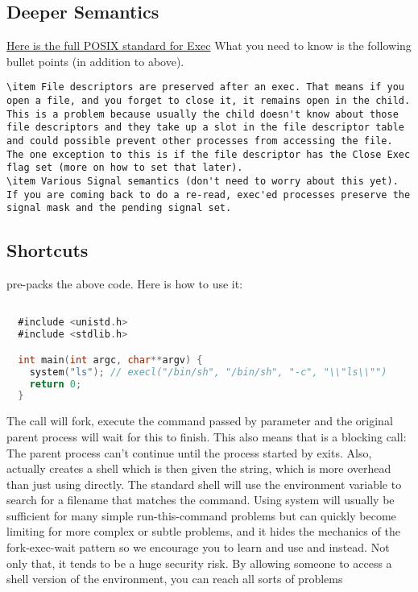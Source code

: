 \subsection{Deeper Semantics}

\href{https://pubs.opengroup.org/onlinepubs/009695399/functions/exec.html}{Here is the full POSIX standard for Exec}
What you need to know is the following bullet points (in addition to above).

\begin{lstlisting}
\item File descriptors are preserved after an exec. That means if you open a file, and you forget to close it, it remains open in the child.
This is a problem because usually the child doesn't know about those file descriptors and they take up a slot in the file descriptor table and could possible prevent other processes from accessing the file. The one exception to this is if the file descriptor has the Close Exec flag set (more on how to set that later).
\item Various Signal semantics (don't need to worry about this yet). If you are coming back to do a re-read, exec'ed processes preserve the signal mask and the pending signal set.
\end{lstlisting}

\subsection{Shortcuts}

 pre-packs the above code. Here is how to use it:

\begin{lstlisting}[language=C]

  #include <unistd.h>
  #include <stdlib.h>

  int main(int argc, char**argv) {
    system("ls"); // execl("/bin/sh", "/bin/sh", "-c", "\\"ls\\"")
    return 0;
  }
\end{lstlisting}

The  call will fork, execute the command passed by parameter and the original parent process will wait for this to finish.
This also means that  is a blocking call: The parent process can't continue until the process started by  exits.
Also,  actually creates a shell which is then given the string, which is more overhead than just using  directly.
The standard shell will use the  environment variable to search for a filename that matches the command. Using system will usually be sufficient for many simple run-this-command problems but can quickly become limiting for more complex or subtle problems, and it hides the mechanics of the fork-exec-wait pattern so we encourage you to learn and use   and  instead.
Not only that, it tends to be a huge security risk. By allowing someone to access a shell version of the environment, you can reach all sorts of problems

